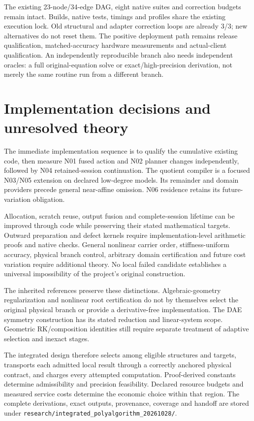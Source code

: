 \documentclass[aps,pra,reprint,onecolumn,10pt,notitlepage,nofootinbib]{revtex4-2}
\begin{document}
The existing 23-node/34-edge DAG, eight native suites and correction budgets
remain intact. Builds, native tests, timings and profiles share the existing
execution lock. Old structural and adapter correction loops are already 3/3;
new alternatives do not reset them. The positive deployment path remains
release qualification, matched-accuracy hardware measurements and actual-client
qualification. An independently reproducible branch also needs independent
oracles: a full original-equation solve or exact/high-precision derivation,
not merely the same routine run from a different branch.

\section{Implementation decisions and unresolved theory}

The immediate implementation sequence is to qualify the cumulative existing
code, then measure N01 fused action and N02 planner changes independently,
followed by N04 retained-session continuation. The quotient compiler is a
focused N03/N05 extension on declared low-degree models. Its remainder and
domain providers precede general near-affine omission. N06 residence retains
its future-variation obligation.

Allocation, scratch reuse, output fusion and complete-session lifetime can be
improved through code while preserving their stated mathematical targets.
Outward preparation and defect kernels require implementation-level arithmetic
proofs and native checks. General nonlinear carrier order, stiffness-uniform
accuracy, physical branch control, arbitrary domain certification and future
cost variation require additional theory. No local failed candidate establishes
a universal impossibility of the project's original construction.

The inherited references preserve these distinctions. Algebraic-geometry
regularization and nonlinear root certification\cite{robust,nonlinear} do not
by themselves select the original physical branch or provide a derivative-free
implementation. The DAE symmetry construction has its stated reduction and
linear-system scope\cite{dae}. Geometric RK/composition identities\cite{eth}
still require separate treatment of adaptive selection and inexact stages.

The integrated design therefore selects among eligible structures and targets,
transports each admitted local result through a correctly anchored physical
contract, and charges every attempted computation. Proof-derived constants
determine admissibility and precision feasibility. Declared resource budgets
and measured service costs determine the economic choice within that region.
The complete derivations, exact outputs, provenance, coverage and handoff are
stored under \nolinkurl{research/integrated_polyalgorithm_20261028/}.
\end{document}

